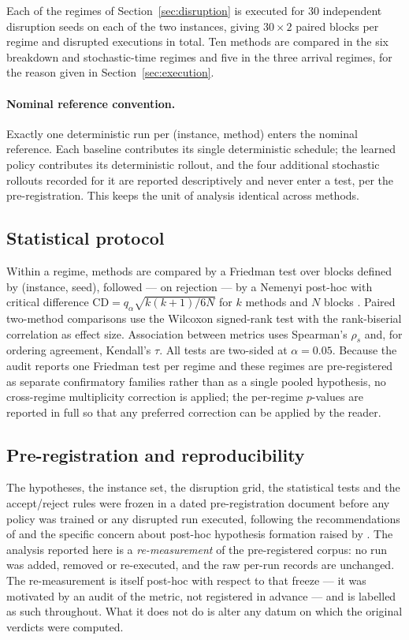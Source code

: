 \documentclass[a4paper,fleqn]{cas-sc}
\begin{document}
Each of the \NRegimes{} regimes of Section~\ref{sec:disruption} is executed for
$30$ independent disruption seeds on each of the two instances, giving
$30\times2$ paired blocks per regime and \NRunsDisrupted{} disrupted executions
in total. Ten methods are compared in the six breakdown and stochastic-time
regimes and five in the three arrival regimes, for the reason given in
Section~\ref{sec:execution}.

\paragraph{Nominal reference convention.} Exactly one deterministic run per
(instance, method) enters the nominal reference. Each baseline contributes its
single deterministic schedule; the learned policy contributes its deterministic
rollout, and the four additional stochastic rollouts recorded for it are
reported descriptively and never enter a test, per the pre-registration. This
keeps the unit of analysis identical across methods.

\subsection{Statistical protocol}\label{sec:stats}

Within a regime, methods are compared by a Friedman test over blocks defined by
(instance, seed), followed --- on rejection --- by a Nemenyi post-hoc with
critical difference $\mathrm{CD}=q_{\alpha}\sqrt{k(k+1)/6N}$ for $k$ methods and
$N$ blocks \citep{demsar2006,garcia2008}. Paired two-method comparisons use the
Wilcoxon signed-rank test with the rank-biserial correlation as effect size.
Association between metrics uses Spearman's $\rho_s$ and, for ordering
agreement, Kendall's $\tau$. All tests are two-sided at $\alpha=0.05$. Because
the audit reports one Friedman test per regime and these regimes are
pre-registered as separate confirmatory families rather than as a single pooled
hypothesis, no cross-regime multiplicity correction is applied; the per-regime
$p$-values are reported in full so that any preferred correction can be applied
by the reader.

\subsection{Pre-registration and reproducibility}\label{sec:prereg}

The hypotheses, the instance set, the disruption grid, the statistical tests and
the accept/reject rules were frozen in a dated pre-registration document before
any policy was trained or any disrupted run executed, following the
recommendations of \citet{munafo2017} and the specific concern about
post-hoc hypothesis formation raised by \citet{kerr1998}. The analysis reported
here is a \emph{re-measurement} of the pre-registered corpus: no run was added,
removed or re-executed, and the raw per-run records are unchanged. The
re-measurement is itself post-hoc with respect to that freeze --- it was
motivated by an audit of the metric, not registered in advance --- and is
labelled as such throughout. What it does not do is alter any datum on which the
original verdicts were computed.
\end{document}
